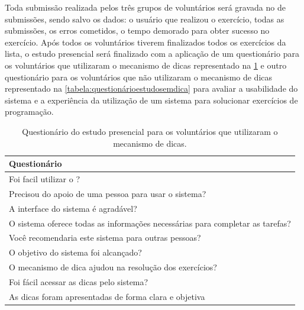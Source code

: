 Toda submissão realizada pelos três grupos de voluntários será gravada no  de submissões, sendo salvo os dados: o usuário que realizou o exercício, todas as submissões, os erros cometidos, o tempo demorado para obter sucesso no exercício. Após todos os voluntários tiverem finalizados todos os exercícios da lista, o estudo presencial será finalizado com a aplicação de um questionário para os voluntários que utilizaram o mecanismo de dicas representado na \cref{tabela:questionárioestudocomdica} e outro questionário para os voluntários que não utilizaram o mecanismo de dicas representado na \cref{tabela:questionárioestudosemdica} para avaliar a usabilidade do sistema e a experiência da utilização de um sistema  para solucionar exercícios de programação.

\begin{table}[]
	\centering
	\captionsetup{justification=centering}
	\caption{Questionário do estudo presencial para os voluntários que utilizaram o mecanismo de dicas.}
	\label{tabela:questionárioestudocomdica}
	\begin{tabular}{l}
		\hline
		Questionário                        											\\ \hline
		Foi facil utilizar o \foreign{iHint}?                            				\\
		Precisou do apoio de uma pessoa para usar o sistema?                           	\\
		A interface do sistema é agradável?                        						\\
		O sistema oferece todas as informações necessárias para completar as tarefas?   \\
		Você recomendaria este sistema para outras pessoas?                           	\\
		O objetivo do sistema foi alcançado? 											\\ 
		O mecanismo de dica ajudou na resolução dos exercícios?							\\
		Foi fácil acessar as dicas pelo sistema?										\\
		As dicas foram apresentadas de forma clara e objetiva							\\ \hline
	\end{tabular}
\end{table}

